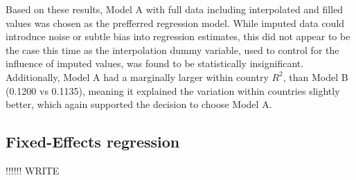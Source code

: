 Based on these results, Model A with full data including interpolated and filled values was chosen 
as the prefferred regression model. While imputed data could introduce noise or subtle bias
into regression estimates, this did not appear to be the case this time as the interpolation dummy 
variable, used to control for the influence of imputed values, was found to be statistically 
insignificant. Additionally, Model A had a marginally larger within country 
$R^2$, than Model B (0.1200 vs 0.1135), meaning it explained the variation within countries 
slightly better, which again supported the decision to choose Model A.

\subsection{Fixed-Effects regression}

!!!!!! WRITE